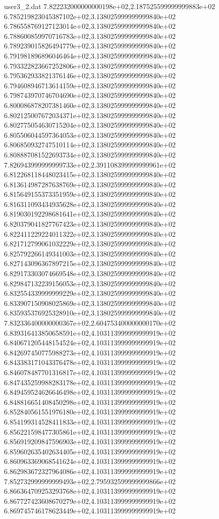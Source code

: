 \begin{filecontents}{user3_2.dat}
7.822232000000000198e+02,2.187525599999999883e+02
6.785219823045387102e+02,3.138025999999999840e+02
6.786558769127123014e+02,3.138025999999999840e+02
6.788600859970716783e+02,3.138025999999999840e+02
6.789239015826494779e+02,3.138025999999999840e+02
6.791981896896046464e+02,3.138025999999999840e+02
6.793322823667252806e+02,3.138025999999999840e+02
6.795362933821376146e+02,3.138025999999999840e+02
6.794608946713614159e+02,3.138025999999999840e+02
6.798743970746704690e+02,3.138025999999999840e+02
6.800086878207381460e+02,3.138025999999999840e+02
6.802125007672034371e+02,3.138025999999999840e+02
6.802775054630715204e+02,3.138025999999999840e+02
6.805506044597364053e+02,3.138025999999999840e+02
6.806850932747510114e+02,3.138025999999999840e+02
6.808887081522693734e+02,3.138025999999999840e+02
7.826943999999999733e+02,2.391108399999999961e+02
6.812268118448023415e+02,3.138025999999999840e+02
6.813614987287638769e+02,3.138025999999999840e+02
6.815649155373351959e+02,3.138025999999999840e+02
6.816311093434935628e+02,3.138025999999999840e+02
6.819030192298681641e+02,3.138025999999999840e+02
6.820379041827767423e+02,3.138025999999999840e+02
6.822411229224011322e+02,3.138025999999999840e+02
6.821712799061032229e+02,3.138025999999999840e+02
6.825792266149341003e+02,3.138025999999999840e+02
6.827143096367897215e+02,3.138025999999999840e+02
6.829173303074669548e+02,3.138025999999999840e+02
6.829847132239156053e+02,3.138025999999999840e+02
6.832554339999999229e+02,3.138025999999999840e+02
6.833907150908025869e+02,3.138025999999999840e+02
6.835935376925328910e+02,3.138025999999999840e+02
7.832336400000000367e+02,2.604753400000000170e+02
6.839316413850658591e+02,4.103113999999999919e+02
6.840671205448154524e+02,4.103113999999999919e+02
6.842697450775988273e+02,4.103113999999999919e+02
6.843383171043376478e+02,4.103113999999999919e+02
6.846078487701316817e+02,4.103113999999999919e+02
6.847435259988283178e+02,4.103113999999999919e+02
6.849459524626646498e+02,4.103113999999999919e+02
6.848816651408450298e+02,4.103113999999999919e+02
6.852840561551976180e+02,4.103113999999999919e+02
6.854199314528411833e+02,4.103113999999999919e+02
6.856221598477305861e+02,4.103113999999999919e+02
6.856919209847596903e+02,4.103113999999999919e+02
6.859602635402634405e+02,4.103113999999999919e+02
6.860963369068541624e+02,4.103113999999999919e+02
6.862983672327964086e+02,4.103113999999999919e+02
7.852732999999999493e+02,2.795932599999999866e+02
6.866364709253293768e+02,4.103113999999999919e+02
6.867727423608670279e+02,4.103113999999999919e+02
6.869745746178623449e+02,4.103113999999999919e+02

\end{filecontents}
